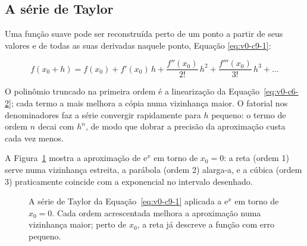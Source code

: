 \documentclass[12pt,a4paper]{article}
\numberwithin{equation}{section}
\numberwithin{table}{section}
\numberwithin{figure}{section}
\begin{document}
\subsection{A série de Taylor}

Uma função suave pode ser reconstruída perto de um ponto a partir de seus
valores e de todas as suas derivadas naquele ponto, Equação
\eqref{eq:v0-c9-1}:

\begin{equation}\label{eq:v0-c9-1}
f(x_0 + h) = f(x_0) + f'(x_0)\,h
  + \frac{f''(x_0)}{2!}\,h^2
  + \frac{f'''(x_0)}{3!}\,h^3 + \dots
\end{equation}

O polinômio truncado na primeira ordem é a linearização da
Equação~\eqref{eq:v0-c6-2}; cada termo a mais melhora a cópia numa
vizinhança maior. O fatorial nos denominadores faz a série convergir
rapidamente para $h$ pequeno: o termo de ordem $n$ decai com $h^n$, de
modo que dobrar a precisão da aproximação custa cada vez menos.

A Figura~\ref{fig:v0-c9-1} mostra a aproximação de $\mathrm{e}^{x}$ em
torno de $x_0 = 0$: a reta (ordem 1) serve numa vizinhança estreita, a
parábola (ordem 2) alarga-a, e a cúbica (ordem 3) praticamente coincide
com a exponencial no intervalo desenhado.

\begin{figure}[H]
\centering
{}
\caption[Série de Taylor da exponencial em torno de $x_0=0$.]{%
A série de Taylor da Equação~\eqref{eq:v0-c9-1} aplicada a
$\mathrm{e}^{x}$ em torno de $x_0 = 0$. Cada ordem acrescentada melhora a
aproximação numa vizinhança maior; perto de $x_0$, a reta já descreve a
função com erro pequeno.}
\label{fig:v0-c9-1}
\end{figure}
\end{document}

